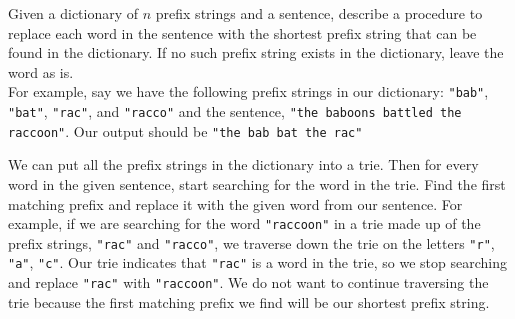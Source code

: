 \begin{blocksection}
\question Given a dictionary of $n$ prefix strings and a sentence, describe a procedure to replace each word in the sentence with the shortest prefix string that can be found in the dictionary. If no such prefix string exists in the dictionary, leave the word as is.
\\ For example, say we have the following prefix strings in our dictionary: \lstinline$"bab"$, \lstinline$"bat"$, \lstinline$"rac"$, and \lstinline$"racco"$ and the sentence, \lstinline$"the baboons battled the raccoon"$. Our output should be \lstinline$"the bab bat the rac"$ 

\begin{solution}[1in]
We can put all the prefix strings in the dictionary into a trie. Then for every word in the given sentence, start searching for the word in the trie. Find the first matching prefix and replace it with the given word from our sentence. For example, if we are searching for the word \lstinline$"raccoon"$ in a trie made up of the prefix strings, \lstinline$"rac"$ and \lstinline$"racco"$, we traverse down the trie on the letters \lstinline$"r"$, \lstinline$"a"$, \lstinline$"c"$. Our trie indicates that \lstinline$"rac"$ is a word in the trie, so we stop searching and replace \lstinline$"rac"$ with \lstinline$"raccoon"$. We do not want to continue traversing the trie because the first matching prefix we find will be our shortest prefix string.
\end{solution}

\end{blocksection}